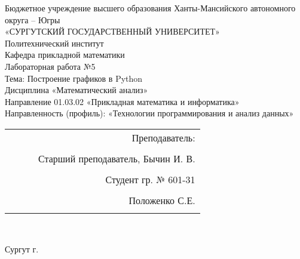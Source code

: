 \documentclass[a4paper]{article}
\begin{document}
\thispagestyle{empty}
\begin{center}

\large{Бюджетное учреждение высшего образования Ханты-Мансийского автономного округа – Югры}\\
\large{«СУРГУТСКИЙ ГОСУДАРСТВЕННЫЙ УНИВЕРСИТЕТ»}\\

\hfill \break
\normalsize{Политехнический институт}\\
 \hfill \break
\normalsize{Кафедра прикладной математики}\\
\hfill\break
\hfill \break
\hfill \break
\hfill \break
\large{Лабораторная работа №5}\\
\normalsize{Тема: Построение графиков в Python}\\
\hfill \break
\hfill \break
\hfill \break
\hfill \break
Дисциплина «Математический анализ»\\
\hfill \break
\small{Направление 01.03.02 «Прикладная математика и информатика»\\
Направленность (профиль): «Технологии программирования и анализ данных»}\\
\end{center}

\hfill \break
\hfill \break
\hfill \break
\hfill \break
\hfill \break
\hfill \break

\begin{flushright}
\normalsize{ 
\begin{tabular}{ccrr}
 & & & Преподаватель: \\\\
 & & & Старший преподаватель, Бычин И. В. \\\\
 & & & Студент гр. № 601-31\\\\
 & & & Положенко С.Е. \\\\
\end{tabular}
}\\
\end{flushright}

\hfill \break
\hfill \break
\begin{center} Сургут \the\year{} г.  \end{center}
\end{document}
